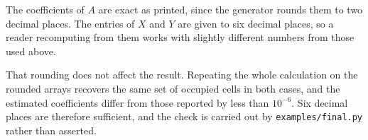 The coefficients of $A$ are exact as printed, since the generator rounds them to two
decimal places. The entries of $X$ and $Y$ are given to six decimal places, so a
reader recomputing from them works with slightly different numbers from those used
above.

That rounding does not affect the result. Repeating the whole calculation on the
rounded arrays recovers the same set of occupied cells in both cases, and the
estimated coefficients differ from those reported by less than $10^{-6}$. Six decimal
places are therefore sufficient, and the check is carried out by
\texttt{examples/final.py} rather than asserted.



